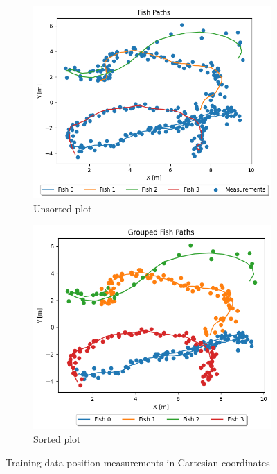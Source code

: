 \documentclass[12pt]{article}
\begin{document}
\begin{figure}[H]
    \centering
    \begin{subfigure}[b]{0.49\textwidth}
        \centering
        \includegraphics[width=\textwidth]{Problem 1/out/p1_pos_plot.png}
        \caption{Unsorted plot}
        \label{fig:p1-pos-plot}
    \end{subfigure}
    \begin{subfigure}[b]{0.49\textwidth}
        \centering
        \includegraphics[width=\textwidth]{Problem 1/out/p1_sorted_pos_plot.png}
        \caption{Sorted plot}
        \label{fig:p1-sorted-pos-plot}
    \end{subfigure}
    \caption{Training data position measurements in Cartesian coordinates}
    \label{fig:p1-pos-plots}
\end{figure}
\end{document}
